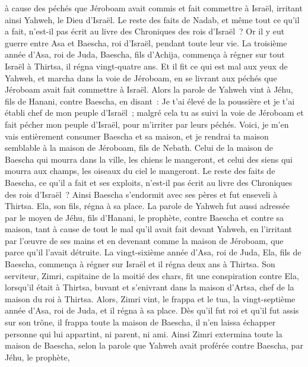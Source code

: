 \begin{multicols}{2}
à cause des péchés que Jéroboam avait commis et fait commettre à Israël, irritant ainsi Yahweh, le Dieu d'Israël.
Le reste des faits de Nadab, et même tout ce qu'il a fait, n'est-il pas écrit au livre des Chroniques des rois d'Israël~?
Or il y eut guerre entre Asa et Baescha, roi d'Israël, pendant toute leur vie.
La troisième année d'Asa, roi de Juda, Baescha, fils d'Achija, commença à régner sur tout Israël à Thirtsa, il régna vingt-quatre ans.
Et il fit ce qui est mal aux yeux de Yahweh, et marcha dans la voie de Jéroboam, en se livrant aux péchés que Jéroboam avait fait commettre à Israël.
\VerseOne{}Alors la parole de Yahweh vint à Jéhu, fils de Hanani, contre Baescha, en disant~:
Je t'ai élevé de la poussière et je t'ai établi chef de mon peuple d'Israël~; malgré cela tu as suivi la voie de Jéroboam et fait pécher mon peuple d'Israël, pour m'irriter par leurs péchés.
Voici, je m'en vais entièrement consumer Baescha et sa maison, et je rendrai ta maison semblable à la maison de Jéroboam, fils de Nebath.
Celui de la maison de Baescha qui mourra dans la ville, les chiens le mangeront, et celui des siens qui mourra aux champs, les oiseaux du ciel le mangeront.
Le reste des faits de Baescha, ce qu'il a fait et ses exploits, n'est-il pas écrit au livre des Chroniques des rois d'Israël~?
Ainsi Baescha s'endormit avec ses pères et fut enseveli à Thirtsa. Ela, son fils, régna à sa place.
La parole de Yahweh fut aussi adressée par le moyen de Jéhu, fils d'Hanani, le prophète, contre Baescha et contre sa maison, tant à cause de tout le mal qu'il avait fait devant Yahweh, en l'irritant par l'œuvre de ses mains et en devenant comme la maison de Jéroboam, que parce qu'il l'avait détruite.
La vingt-sixième année d'Asa, roi de Juda, Ela, fils de Baescha, commença à régner sur Israël et il régna deux ans à Thirtsa.
Son serviteur, Zimri, capitaine de la moitié des chars, fit une conspiration contre Ela, lorsqu'il était à Thirtsa, buvant et s'enivrant dans la maison d'Artsa, chef de la maison du roi à Thirtsa.
Alors, Zimri vint, le frappa et le tua, la vingt-septième année d'Asa, roi de Juda, et il régna à sa place.
Dès qu'il fut roi et qu'il fut assis sur son trône, il frappa toute la maison de Baescha, il n'en laissa échapper personne qui lui appartint, ni parent, ni ami.
Ainsi Zimri extermina toute la maison de Baescha, selon la parole que Yahweh avait proférée contre Baescha, par Jéhu, le prophète,

\end{multicols}
